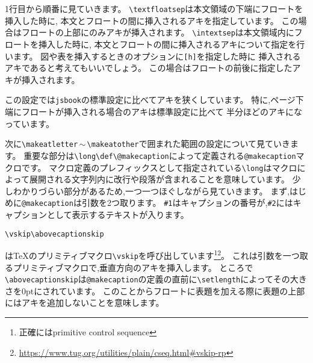 1行目から順番に見ていきます。
\verb|\textfloatsep|は本文領域の下端にフロートを挿入した時に,
本文とフロートの間に挿入されるアキを指定しています。
この場合はフロートの上部にのみアキが挿入されます。
\verb|\intextsep|は本文領域内にフロートを挿入した時に,
本文とフロートの間に挿入されるアキについて指定を行います。
図や表を挿入するときのオプションに\texttt{[h]}を指定した時に
挿入されるアキであると考えてもいいでしょう。
この場合はフロートの前後に指定したアキが挿入されます。

この設定では\texttt{jsbook}の標準設定に比べてアキを狭くしています。
特に,ページ下端にフロートが挿入される場合のアキは標準設定に比べて
半分ほどのアキになっています。

次に\verb|\makeatletter|\,$\sim$\,\verb|\makeatother|で囲まれた範囲の設定について見ていきます。
重要な部分は\verb|\long\def\@makecaption|によって定義される\verb|@makecaption|マクロです。
マクロ定義のプレフィックスとして指定されている\verb|\long|はマクロによって展開される文字列内に改行や段落が含まれることを意味しています。
少しわかりづらい部分があるため,一つ一つほぐしながら見ていきます。
まず,はじめに\verb|@makecaption|は引数を2つ取ります。
\verb|#1|はキャプションの番号が,\verb|#2|にはキャプションとして表示するテキストが入ります。

\begin{verbatim}
\vskip\abovecaptionskip
\end{verbatim}%
は{\TeX}のプリミティブマクロ\verb|\vskip|を呼び出しています\footnote{正確にはprimitive control sequence}\footnote{\url{https://www.tug.org/utilities/plain/cseq.html#vskip-rp}}。
これは引数を一つ取るプリミティブマクロで,垂直方向のアキを挿入します。
ところで\verb|\abovecaptionskip|は\verb|@makecaption|の定義の直前に\verb|\setlength|によってその大きさを0ptにされています。
このことからフロートに表題を加える際に表題の上部にはアキを追加しないことを意味します。

